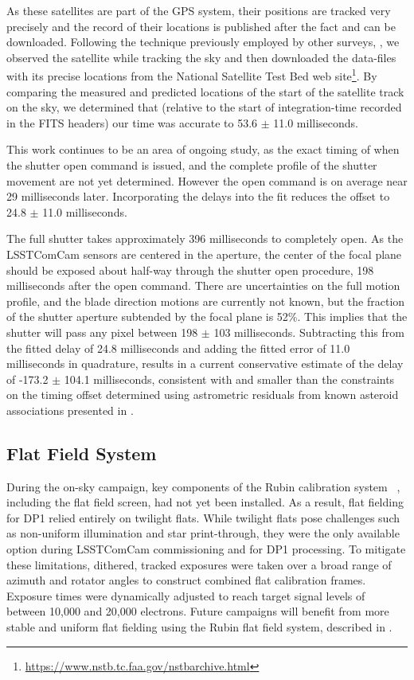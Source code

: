 As these satellites are part of the GPS system, their positions are tracked very precisely and the record of their locations is published after the fact and can be downloaded.
Following the technique previously employed by other surveys, \citep{2018PASP..130f4505T},  we observed the satellite while tracking the sky and then downloaded the data-files
with its precise locations from the National Satellite Test Bed web site\footnote{\url{https://www.nstb.tc.faa.gov/nstbarchive.html}}.
By comparing the measured and predicted locations of the start of the satellite track on the sky, we determined that (relative to the start of integration-time recorded in the FITS headers) our time was accurate to 53.6 $\pm$ 11.0 milliseconds.

This work continues to be an area of ongoing study, as the exact timing of when the shutter open command is issued, and the complete profile of the shutter movement are not yet determined.
However the open command is on average near 29 milliseconds later. Incorporating the delays into the fit reduces the offset to 24.8 $\pm$ 11.0 milliseconds.

The full shutter takes approximately 396 milliseconds to completely open.
As the \gls{LSSTComCam} sensors are centered in the aperture, the center of the focal plane should be exposed about half-way through the shutter open procedure, 198 milliseconds after the open command.
There are uncertainties on the full motion profile, and the blade direction motions are currently not known, but the fraction of the shutter aperture subtended by the focal plane is 52\%.
This implies that the shutter will pass any pixel between 198 $\pm$ 103 milliseconds.
Subtracting this from the fitted delay of 24.8 milliseconds and adding the fitted error of 11.0 milliseconds in quadrature, results in a current conservative estimate of the delay of -173.2 $\pm$ 104.1 milliseconds, consistent with and smaller than the constraints on the timing offset determined using astrometric residuals from known asteroid associations presented in .

\subsection{Flat Field System}
\label{ssec:flat_field_system}
During the on-sky campaign, key components of the Rubin calibration system ~\citep{2022SPIE12182E..0RI}, including the flat field screen, had not yet been installed.
As a result, flat fielding for \gls{DP1} relied entirely on twilight flats.
While twilight flats pose challenges such as non-uniform illumination and star print-through, they were the only available option during \gls{LSSTComCam} commissioning and for DP1 processing.
To mitigate these limitations, dithered, tracked exposures were taken over a broad range of azimuth and rotator angles to construct combined flat \gls{calibration} frames.
Exposure times were dynamically adjusted to reach target signal levels of between 10,000 and 20,000 electrons.
Future campaigns will benefit from more stable and uniform flat fielding using the Rubin flat field system, described in \citet{SITCOMTN-086}.


